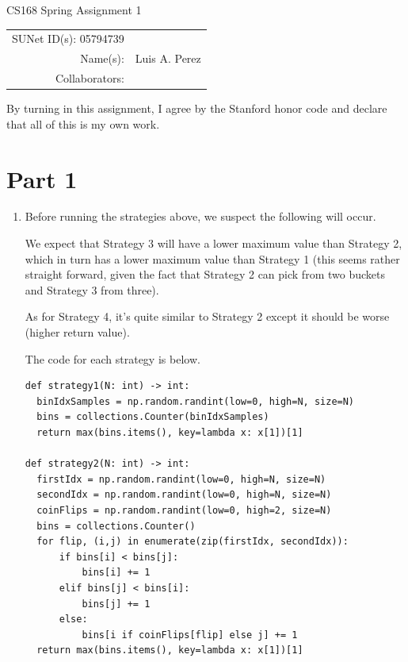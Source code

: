 \documentclass[12pt]{article}
\begin{document}
\begin{center}
{\Large CS168 Spring Assignment 1}

\begin{tabular}{rl}
SUNet ID(s): 05794739 & \\
Name(s): & Luis A. Perez \\
Collaborators: &
\end{tabular}
\end{center}

By turning in this assignment, I agree by the Stanford honor code and declare
that all of this is my own work.

\section*{Part 1}

\begin{enumerate}[label=(\alph*)]
  \item
    Before running the strategies above, we suspect the following will occur. 

    We expect that Strategy 3 will have a lower maximum value than Strategy 2, which in turn has a lower maximum value than Strategy 1 (this seems rather straight forward, given the fact that Strategy 2 can pick from two buckets and Strategy 3 from three).

    As for Strategy 4, it's quite similar to Strategy 2 except it should be worse (higher return value).

    The code for each strategy is below.
    \begin{verbatim}
def strategy1(N: int) -> int:
  binIdxSamples = np.random.randint(low=0, high=N, size=N)
  bins = collections.Counter(binIdxSamples)
  return max(bins.items(), key=lambda x: x[1])[1]

def strategy2(N: int) -> int:
  firstIdx = np.random.randint(low=0, high=N, size=N)
  secondIdx = np.random.randint(low=0, high=N, size=N)
  coinFlips = np.random.randint(low=0, high=2, size=N)
  bins = collections.Counter()
  for flip, (i,j) in enumerate(zip(firstIdx, secondIdx)):
      if bins[i] < bins[j]:
          bins[i] += 1
      elif bins[j] < bins[i]:
          bins[j] += 1
      else:
          bins[i if coinFlips[flip] else j] += 1
  return max(bins.items(), key=lambda x: x[1])[1]


\end{verbatim}
\end{enumerate}
\end{document}
